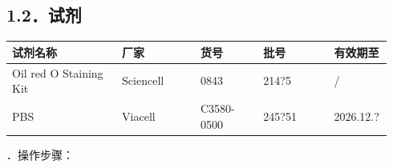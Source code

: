\documentclass[UTF8,10pt,a4paper,fontset=fandol]{ctexart}
\newcommand{\fieldvalue}[1]{#1}
\newcommand{\handwritten}[1]{#1}
\begin{document}
\subsection*{1.2．试剂}

\begin{center}
\begin{tabular}{|p{0.28\linewidth}|p{0.20\linewidth}|p{0.16\linewidth}|p{0.18\linewidth}|p{0.12\linewidth}|}
\hline
试剂名称 & 厂家 & 货号 & 批号 & 有效期至 \\ \hline
Oil red O Staining Kit &
\fieldvalue{Sciencell} &
\fieldvalue{0843} &
\fieldvalue{\handwritten{214?5}} &
\fieldvalue{/}
\\ \hline
PBS &
\fieldvalue{Viacell} &
\fieldvalue{C3580-0500} &
\fieldvalue{\handwritten{245?51}} &
\fieldvalue{\handwritten{2026.12.?}}
\\ \hline
\end{tabular}
\end{center}

．操作步骤：
\end{document}
